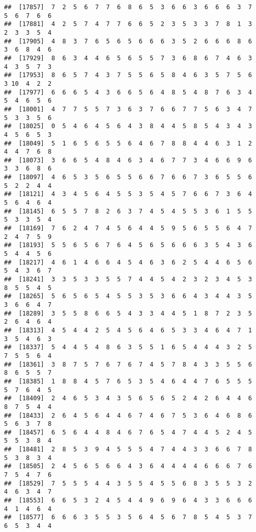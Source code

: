 \documentclass[
]{book}
\begin{document}
\begin{verbatim}
##  [17857]  7  2  5  6  7  7  6  8  6  5  3  6  6  3  6  6  6  3  7  5  6  7  6  6
##  [17881]  4  2  5  7  4  7  7  6  6  5  2  3  5  3  3  7  8  1  3  2  3  3  5  4
##  [17905]  4  8  3  7  6  5  6  5  6  6  6  3  5  2  6  6  6  8  6  3  6  8  4  6
##  [17929]  8  6  3  4  4  6  5  6  5  5  7  3  6  8  6  7  4  6  3  4  3  5  7  3
##  [17953]  8  6  5  7  4  3  7  5  5  6  5  8  4  6  3  5  7  5  6  3 10  4  2  2
##  [17977]  6  6  6  5  4  3  6  6  5  6  4  8  5  4  8  7  6  3  4  5  4  6  5  6
##  [18001]  4  7  7  5  5  7  3  6  3  7  6  6  7  7  5  6  3  4  7  5  3  3  5  6
##  [18025]  0  5  4  6  4  5  6  4  3  8  4  4  5  8  5  4  3  4  3  4  5  6  5  3
##  [18049]  5  1  6  5  6  5  5  6  4  6  7  8  8  4  4  6  3  1  2  4  4  7  6  8
##  [18073]  3  6  6  5  4  8  4  6  3  4  6  7  7  3  4  6  6  9  6  3  3  6  8  6
##  [18097]  4  6  5  3  5  6  5  5  6  6  7  6  6  7  3  6  5  5  6  5  2  2  4  4
##  [18121]  4  3  4  5  6  4  5  5  3  5  4  5  7  6  6  7  3  6  4  5  6  4  6  4
##  [18145]  6  5  5  7  8  2  6  3  7  4  5  4  5  5  3  6  1  5  5  5  3  3  5  4
##  [18169]  7  6  2  4  7  4  5  6  4  4  5  9  5  6  5  5  6  4  7  2  4  7  5  9
##  [18193]  5  5  6  5  6  7  6  4  5  6  5  6  6  6  3  5  4  3  6  5  4  4  5  6
##  [18217]  4  6  1  4  6  6  4  5  4  6  3  6  2  5  4  4  6  5  6  5  4  3  6  7
##  [18241]  3  3  5  3  3  5  5  7  4  4  5  4  2  3  2  3  4  5  3  8  5  5  4  5
##  [18265]  5  6  5  6  5  4  5  5  3  5  3  6  6  4  3  4  4  3  5  3  6  6  4  7
##  [18289]  3  5  5  8  6  6  5  4  3  3  4  4  5  1  8  7  2  3  5  2  6  4  6  4
##  [18313]  4  5  4  4  2  5  4  5  6  4  6  5  3  3  4  6  4  7  1  3  5  4  6  3
##  [18337]  5  4  4  5  4  8  6  3  5  5  1  6  5  4  4  4  3  2  5  7  5  5  6  4
##  [18361]  3  8  7  5  7  6  7  6  7  4  5  7  8  4  3  3  5  5  6  8  6  5  5  7
##  [18385]  1  8  8  4  5  7  6  5  3  5  4  6  4  4  7  6  5  5  5  5  7  6  4  5
##  [18409]  2  4  6  5  3  4  3  5  6  5  6  5  2  4  2  6  4  4  6  8  7  5  4  4
##  [18433]  2  6  4  5  6  4  4  6  7  4  6  7  5  3  6  4  6  8  6  5  6  3  7  8
##  [18457]  6  5  6  4  4  8  4  6  7  6  5  4  7  4  4  5  2  4  5  5  5  3  8  4
##  [18481]  2  8  5  3  9  4  5  5  5  4  7  4  4  3  3  6  6  7  8  5  3  8  3  4
##  [18505]  2  4  5  6  5  6  6  4  3  6  4  4  4  4  6  6  6  7  6  7  5  4  7  6
##  [18529]  7  5  5  5  4  4  3  5  5  4  5  5  6  8  3  5  5  3  2  4  6  3  4  7
##  [18553]  6  6  5  3  2  4  5  4  4  9  6  9  6  4  3  3  6  6  6  4  1  4  6  4
##  [18577]  6  6  6  3  5  5  3  5  6  4  5  6  7  8  5  4  5  3  7  6  5  3  4  4

\end{verbatim}
\end{document}
